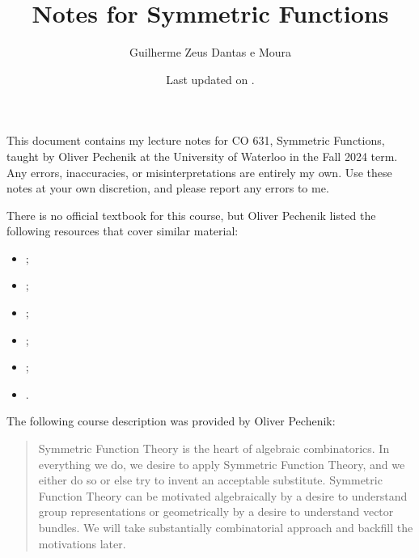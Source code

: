 \documentclass{scrbook}
\title{Notes for Symmetric Functions}
\author{Guilherme Zeus Dantas e Moura}
\date{Last updated on \DTMnow.}
\theoremstyle{definition}
\begin{document}
	\maketitle

  This document contains my lecture notes for CO 631, Symmetric Functions,
  taught by Oliver Pechenik at the University of Waterloo in the Fall 2024 term.
  Any errors, inaccuracies, or misinterpretations are entirely my own.
  Use these notes at your own discretion, and please report any errors to me.

  There is no official textbook for this course, but Oliver Pechenik listed the following resources that cover similar material:
  \begin{itemize}
    \item {};
    \item {};
    \item {};
    \item {};
    \item {};
    \item {}.
  \end{itemize}
  
  The following course description was provided by Oliver Pechenik:
  \begin{quote}
    Symmetric Function Theory is the heart of algebraic combinatorics.
    In everything we do, we desire to apply Symmetric Function Theory, and we either do so or else try to invent an acceptable substitute.
    Symmetric Function Theory can be motivated algebraically by a desire to understand group representations or geometrically by a desire to understand vector bundles.
    We will take substantially combinatorial approach and backfill the motivations later.
  \end{quote}

  \tableofcontents

    
    
    
    
    
    

    \printbibliography
\end{document}
